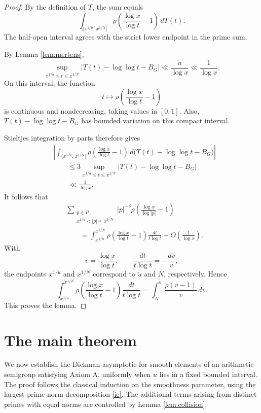 \documentclass[10pt,a4paper]{amsart}
\begin{document}
\begin{proof}
By the definition of $T$, the sum equals
\[
\int_{(x^{1/\tilde u},\,x^{1/N}]}
\rho\!\left(\frac{\log x}{\log t}-1\right)\,dT(t).
\]
The half-open interval agrees with the strict lower
endpoint in the prime sum.

By Lemma \ref{lem:mertens},
\[
\sup_{x^{1/\tilde u}\le t\le x^{1/N}}
|T(t)-\log\log t-B_G|
\ll\frac{\tilde u}{\log x}
\ll\frac1{\log x}.
\]
On this interval, the function
\[
t\longmapsto
\rho\!\left(\frac{\log x}{\log t}-1\right)
\]
is continuous and nondecreasing, taking values in $[0,1]$.
Also, $T(t)-\log\log t-B_G$ has bounded variation on this
compact interval.

Stieltjes integration by parts therefore gives
\begin{align*}
&\left|
\int_{(x^{1/\tilde u},\,x^{1/N}]}
\rho\!\left(\frac{\log x}{\log t}-1\right)
\,d\bigl(T(t)-\log\log t-B_G\bigr)
\right|\\
&\qquad\le
3\sup_{x^{1/\tilde u}\le t\le x^{1/N}}
|T(t)-\log\log t-B_G|\\
&\qquad\ll\frac1{\log x}.
\end{align*}
It follows that
\begin{align*}
&\sum_{\substack{p\in P\\
x^{1/\tilde u}<|p|\le x^{1/N}}}
|p|^{-\delta}
\rho\!\left(\frac{\log x}{\log|p|}-1\right)\\
&\qquad=
\int_{x^{1/\tilde u}}^{x^{1/N}}
\rho\!\left(\frac{\log x}{\log t}-1\right)
\frac{dt}{t\log t}
+O\!\left(\frac1{\log x}\right).
\end{align*}
With
\[
v=\frac{\log x}{\log t},
\qquad
\frac{dt}{t\log t}=-\frac{dv}{v},
\]
the endpoints $x^{1/\tilde u}$ and $x^{1/N}$ correspond
to $\tilde u$ and $N$, respectively. Hence
\[
\int_{x^{1/\tilde u}}^{x^{1/N}}
\rho\!\left(\frac{\log x}{\log t}-1\right)
\frac{dt}{t\log t}
=
\int_N^{\tilde u}\frac{\rho(v-1)}v\,dv.
\]
This proves the lemma.
\end{proof}


\section{The main theorem}\label{sec:main}
We now establish the Dickman asymptotic for smooth
elements of an arithmetic semigroup satisfying Axiom A,
uniformly when $u$ lies in a fixed bounded interval.
The proof follows the classical induction on the
smoothness parameter, using the largest-prime-norm
decomposition \eqref{ie}. The additional terms arising
from distinct primes with equal norms are controlled
by Lemma \ref{lem:collision}.
\end{document}
